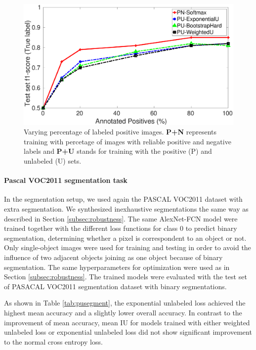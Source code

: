 \begin{figure}[t]
\centering
   \includegraphics[width=\linewidth]{img/pu_vs_pn}
\caption{Varying percentage of labeled positive images. \textbf{P+N} represents training with percetage of images with reliable positive and negative labels and \textbf{P+U} stands for training with the positive (P) and unlabeled (U) sets.}
\label{fig:pct_annotating}
\end{figure}

\paragraph{Pascal VOC2011 segmentation task}
In the segmentation setup, we used again the PASCAL VOC2011 dataset with extra segmentation\cite{hariharan2011semantic}.
We synthesized inexhaustive segmentations the same way as described in Section \ref{subsec:robustness}.
The same AlexNet-FCN model were trained together with the different loss functions for class 0 to predict binary segmentation, determining whether a pixel is correspondent to an object or not.
Only single-object images were used for training and testing in order to avoid the influence of two adjacent objects joining as one object because of  binary segmentation.
The same hyperparameters for optimization were used as in Section \ref{subsec:robustness}.
The trained models were evaluated with the test set of PASACAL VOC2011 segmentation dataset with binary segmentations.

\noindent
As shown in Table \ref{tab:pusegment}, the exponential unlabeled loss achieved the highest mean accuracy and a slightly lower overall accuracy.
In contrast to the improvement of mean accuracy, mean IU for models trained with either weighted unlabeled loss or exponential unlabeled loss did not show significant improvement to the normal cross entropy loss.


